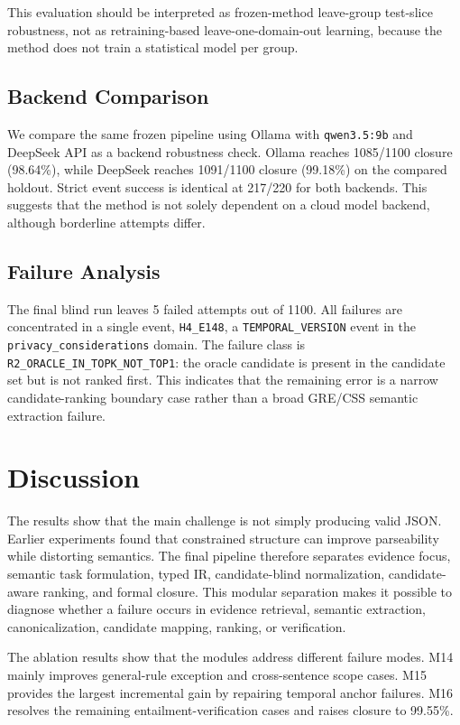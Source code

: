 \documentclass[11pt]{article}
\begin{document}
This evaluation should be interpreted as frozen-method leave-group test-slice robustness, not as retraining-based leave-one-domain-out learning, because the method does not train a statistical model per group.

\subsection{Backend Comparison}

We compare the same frozen pipeline using Ollama with \texttt{qwen3.5:9b} and DeepSeek API as a backend robustness check. Ollama reaches 1085/1100 closure (98.64\%), while DeepSeek reaches 1091/1100 closure (99.18\%) on the compared holdout. Strict event success is identical at 217/220 for both backends. This suggests that the method is not solely dependent on a cloud model backend, although borderline attempts differ.

\subsection{Failure Analysis}

The final blind run leaves 5 failed attempts out of 1100. All failures are concentrated in a single event, \texttt{H4\_E148}, a \texttt{TEMPORAL\_VERSION} event in the \texttt{privacy\_considerations} domain. The failure class is \texttt{R2\_ORACLE\_IN\_TOPK\_NOT\_TOP1}: the oracle candidate is present in the candidate set but is not ranked first. This indicates that the remaining error is a narrow candidate-ranking boundary case rather than a broad GRE/CSS semantic extraction failure.

\section{Discussion}

The results show that the main challenge is not simply producing valid JSON. Earlier experiments found that constrained structure can improve parseability while distorting semantics. The final pipeline therefore separates evidence focus, semantic task formulation, typed IR, candidate-blind normalization, candidate-aware ranking, and formal closure. This modular separation makes it possible to diagnose whether a failure occurs in evidence retrieval, semantic extraction, canonicalization, candidate mapping, ranking, or verification.

The ablation results show that the modules address different failure modes. M14 mainly improves general-rule exception and cross-sentence scope cases. M15 provides the largest incremental gain by repairing temporal anchor failures. M16 resolves the remaining entailment-verification cases and raises closure to 99.55\%.
\end{document}
